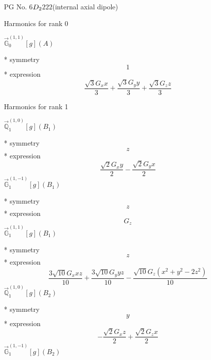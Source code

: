 \documentclass[fleqn,8pt]{jsarticle}
\begin{document}
\setcounter{MaxMatrixCols}{32}

\renewcommand{\tablename}{Table~}
\renewcommand{\figurename}{Figure~}
\begin{center}
\LARGE
PG No. 6\quad$D_{\rm 2}$\quad$222$\quad[ orthorhombic ] (internal axial dipole)
\end{center}

\noindent * Harmonics for rank 0

\noindent\quad $\vec{\mathbb{G}}_{0}^{(1,1)}[g](A)$

\noindent\quad ** symmetry
\begin{dmath*}
1
\end{dmath*}
\noindent\quad ** expression
\begin{dmath*}
\frac{\sqrt{3} G_{x} x}{3} + \frac{\sqrt{3} G_{y} y}{3} + \frac{\sqrt{3} G_{z} z}{3}
\end{dmath*}

\noindent * Harmonics for rank 1

\noindent\quad $\vec{\mathbb{Q}}_{1}^{(1,0)}[g](B_{1})$

\noindent\quad ** symmetry
\begin{dmath*}
z
\end{dmath*}
\noindent\quad ** expression
\begin{dmath*}
\frac{\sqrt{2} G_{x} y}{2} - \frac{\sqrt{2} G_{y} x}{2}
\end{dmath*}
\noindent\quad $\vec{\mathbb{G}}_{1}^{(1,-1)}[g](B_{1})$

\noindent\quad ** symmetry
\begin{dmath*}
z
\end{dmath*}
\noindent\quad ** expression
\begin{dmath*}
G_{z}
\end{dmath*}
\noindent\quad $\vec{\mathbb{G}}_{1}^{(1,1)}[g](B_{1})$

\noindent\quad ** symmetry
\begin{dmath*}
z
\end{dmath*}
\noindent\quad ** expression
\begin{dmath*}
\frac{3 \sqrt{10} G_{x} x z}{10} + \frac{3 \sqrt{10} G_{y} y z}{10} - \frac{\sqrt{10} G_{z} \left(x^{2} + y^{2} - 2 z^{2}\right)}{10}
\end{dmath*}
\noindent\quad $\vec{\mathbb{Q}}_{1}^{(1,0)}[g](B_{2})$

\noindent\quad ** symmetry
\begin{dmath*}
y
\end{dmath*}
\noindent\quad ** expression
\begin{dmath*}
- \frac{\sqrt{2} G_{x} z}{2} + \frac{\sqrt{2} G_{z} x}{2}
\end{dmath*}
\noindent\quad $\vec{\mathbb{G}}_{1}^{(1,-1)}[g](B_{2})$
\end{document}
